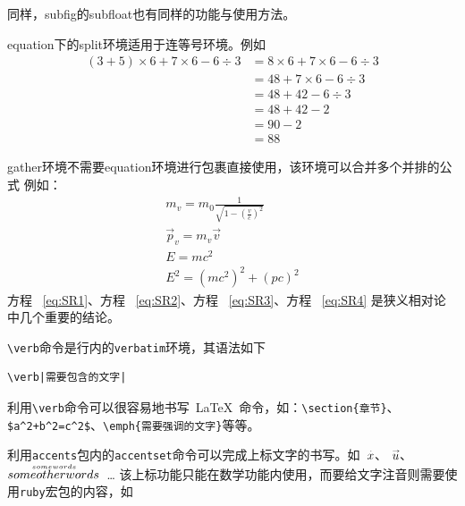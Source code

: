 \documentclass[UTF8]{ctexart}
\begin{document}
	同样，subfig的subfloat也有同样的功能与使用方法。

	equation下的split环境适用于连等号环境。例如
	\begin{equation}
		\begin{split}
			(3 + 5) \times 6 + 7 \times 6 - 6 \div 3 &= 8 \times 6 + 7 \times 6 - 6 \div 3 \\
			&= 48 + 7 \times 6 - 6 \div 3 \\
			&= 48 + 42 - 6 \div 3 \\
			&= 48 + 42 - 2 \\
			&= 90 -2 \\
			&= 88
		\end{split}
	\end{equation}

	gather环境不需要equation环境进行包裹直接使用，该环境可以合并多个并排的公式
	例如：
	\begin{gather}
		m_{v} = m_0\frac{1}{\sqrt{1-\left(\frac{v}{c}\right)^2}}   \label{eq:SR1} \\
		\vec{p}_v = m_v\vec{v}                                     \label{eq:SR2} \\
		E = mc^{2}                                                 \label{eq:SR3} \\
		E^{2} = \left(mc^{2}\right)^{2} + (pc)^2                   \label{eq:SR4}
	\end{gather}
	方程 ~\ref{eq:SR1}、方程 ~\ref{eq:SR2}、方程 ~\ref{eq:SR3}、方程 ~\ref{eq:SR4} 是狭义相对论中几个重要的结论。
	
	\verb|\verb|命令是行内的\verb|verbatim|环境，其语法如下

	\begin{center}
		\begin{BVerbatim}
\verb|需要包含的文字|
		\end{BVerbatim}
	\end{center}

	利用\verb|\verb|命令可以很容易地书写~\LaTeX~命令，如：\verb|\section{章节}|、\verb|$a^2+b^2=c^2$|、\verb|\emph{需要强调的文字}|等等。

	利用\verb|accents|包内的\verb|accentset|命令可以完成上标文字的书写。如~$\accentset{\cdot}{x}$、
	$\accentset{\rightarrow}{u}$、$\accentset{some words}{some other words}$~\dots
	该上标功能只能在数学功能内使用，而要给文字注音则需要使用\verb|ruby|宏包的内容，如
	

	


\end{document}
